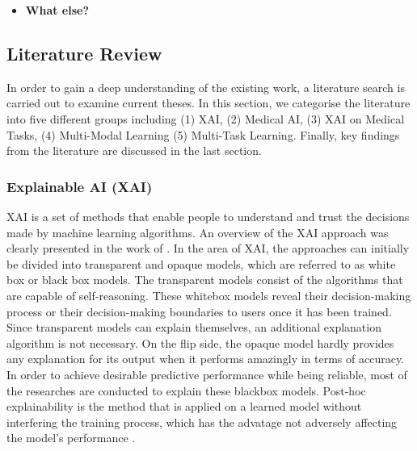 \begin{itemize}
    \item \textbf{What else?}
\end{itemize}



\subsection{Literature Review}

In order to gain a deep understanding of the existing work, a literature search is carried out to examine current theses. In this section, we categorise the literature into five different groups including (1) XAI, (2) Medical AI, (3) XAI on Medical Tasks, (4) Multi-Modal Learning (5) Multi-Task Learning. Finally, key findings from the literature are discussed in the last section.

\subsubsection{Explainable AI (XAI)}

XAI is a set of methods that enable people to understand and trust the decisions made by machine learning algorithms. An overview of the XAI approach was clearly presented in the work of \citet{Belle2020XAIPriciples}. In the area of ​XAI, the approaches can initially be divided into transparent and opaque models, which are referred to as white box or black box models. The transparent models consist of the algorithms that are capable of self-reasoning. These whitebox models reveal their decision-making process or their decision-making boundaries to users once it has been trained. Since transparent models can explain themselves, an additional explanation algorithm is not necessary. On the flip side, the opaque model hardly provides any explanation for its output when it performs amazingly in terms of accuracy. In order to achieve desirable predictive performance while being reliable, most of the researches are conducted to explain these blackbox models. Post-hoc explainability is the method that is applied on a learned model without interfering the training process, which has the advatage not adversely affecting the model's performance \citep{Karlo2018XAISurvey} \citep{Belle2020XAIPriciples}. \\

